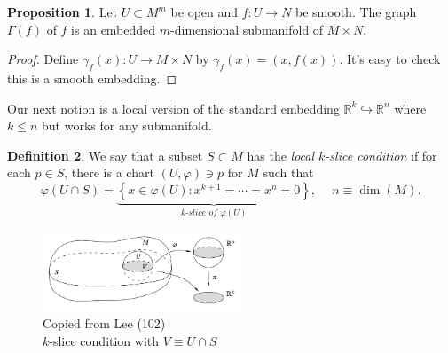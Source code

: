 \documentclass[10pt,letterpaper,cm]{nupset}
\theoremstyle{definition}
\newtheorem{definition}{Definition}[subsection]
\theoremstyle{theorem}
\newtheorem{prop}[definition]{Proposition}
\theoremstyle{remark}
\newcommand{\R}{\mathbb R}
\newcommand{\1}{\mathbf{1}}
\newcommand{\0}{\vec 0}
\begin{document}
\begin{prop}
Let $U \subset M^m$ be open and $f: U \to N$ be smooth. The graph $\Gamma(f)$ of $f$ is an embedded $m$-dimensional submanifold of $M \times N$.
\end{prop}
\begin{proof}
Define $\gamma_f(x) : U \to M \times N$ by $\gamma_f(x) = \left(x, f(x)\right)$. It's easy to check this is a smooth embedding.
\end{proof}

\medskip

Our next notion is a local version of the standard embedding $\R^k \hookrightarrow \R^n$ where $k\leq n$ but works for any submanifold.

\begin{definition}
We say that a subset $S\subset M$ has the \textit{local $k$-slice condition} if for each $p\in S$, there is a chart $\left(U, \varphi\right)\ni p$ for $M$ such that $$\varphi(U \cap S) = \underbrace{\left\{x\in \varphi(U) : x^{k+1} = \cdots = x^n = 0\right\}}_{k\textit{-slice of }\varphi(U)}, \ \quad n \equiv \dim(M). $$ 

\begin{figure}[h]
\centering
\includegraphics[width=60mm]{slice.png}
\caption[Copied from Lee (102); $k$-slice condition with $V\equiv U \cap S$]
{Copied from Lee (102) \\ $k$-slice condition with $V\equiv U \cap S$\endtabular}
\end{figure}
\end{definition}
\end{document}
